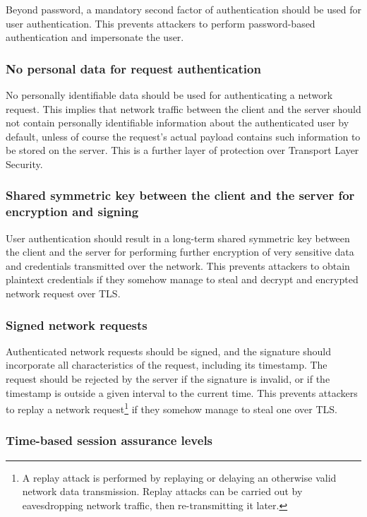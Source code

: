 Beyond password, a mandatory second factor of authentication should be used for user authentication. This prevents attackers to perform password-based authentication and impersonate the user.

\subsubsection{No personal data for request authentication}

No personally identifiable data should be used for authenticating a network request. This implies that network traffic between the client and the server should not contain personally identifiable information about the authenticated user by default, unless of course the request's actual payload contains such information to be stored on the server. This is a further layer of protection over Transport Layer Security.

\subsubsection{Shared symmetric key between the client and the server for encryption and signing}

User authentication should result in a long-term shared symmetric key between the client and the server for performing further encryption of very sensitive data and credentials transmitted over the network. This prevents attackers to obtain plaintext credentials if they somehow manage to steal and decrypt and encrypted network request over TLS.

\subsubsection{Signed network requests}

Authenticated network requests should be signed, and the signature should incorporate all characteristics of the request, including its timestamp. The request should be rejected by the server if the signature is invalid, or if the timestamp is outside a given interval to the current time. This prevents attackers to replay a network request\footnote{A replay attack is performed by replaying or delaying an otherwise valid network data transmission. Replay attacks can be carried out by eavesdropping network traffic, then re-transmitting it later.} if they somehow manage to steal one over TLS.

\subsubsection{Time-based session assurance levels}


